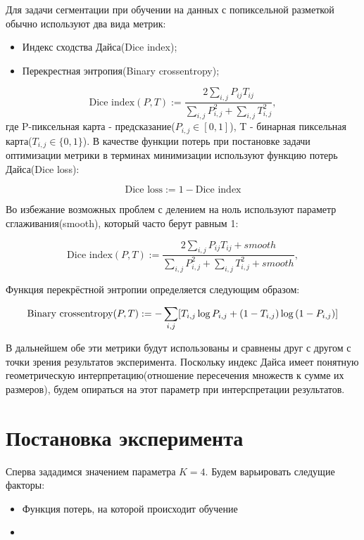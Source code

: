 Для задачи сегментации при обучении на данных с попиксельной разметкой обычно используют два вида метрик:
\begin{itemize}
    \item Индекс сходства Дайса(Dice index);
    \item Перекрестная энтропия(Binary crossentropy);
\end{itemize}

$$\text{Dice~index}(P,T) := \frac{2\sum_{i,j}P_{ij}T_{ij}}{\sum_{i,j}P^2_{i,j} + \sum_{i,j}T^2_{i,j}},$$
где P-пиксельная карта - предсказание($P_{i,j}\in [0,1]$), T - бинарная пиксельная карта($T_{i,j}\in\{0,1\}$). В качестве функции потерь при постановке задачи оптимизации метрики в терминах минимизации используют функцию потерь Дайса(Dice loss):

$$\text{Dice~loss} := 1 - \text{Dice~index}$$

Во избежание возможных проблем с делением на ноль используют параметр сглаживания(smooth), который часто берут равным 1:

$$\text{Dice~index}(P,T) := \frac{2\sum_{i,j}P_{ij}T_{ij} + smooth}{\sum_{i,j}P^2_{i,j} + \sum_{i,j}T^2_{i,j} + smooth},$$

Функция перекрёстной энтропии определяется следующим образом:

$$\text{Binary~crossentropy}(P, T) := -\sum_{i,j}\Large[T_{i,j}\log{P_{i,j}} + (1-T_{i,j})\log{(1-P_{i,j})}\Large]$$

В дальнейшем обе эти метрики будут использованы и сравнены друг с другом с точки зрения результатов эксперимента. Поскольку индекс Дайса имеет понятную геометрическую интерпретацию(отношение пересечения множеств к сумме их размеров), будем опираться на этот параметр при интерспретации результатов.

\section{Постановка эксперимента}

Сперва зададимся значением параметра $K = 4$. Будем варьировать следущие факторы:

\begin{itemize}
    \item Функция потерь, на которой происходит обучение  
    \item
\end{itemize}

\clearpage
